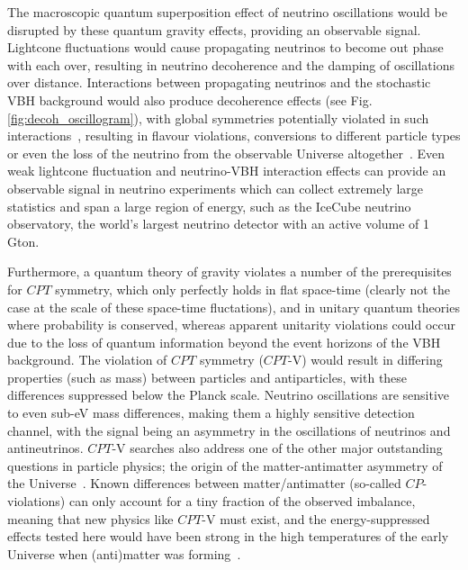 \documentclass[a4paper,11pt]{article}
\begin{document}
The macroscopic quantum superposition effect of neutrino oscillations would be disrupted by these quantum gravity effects, providing an observable signal. Lightcone fluctuations would cause propagating neutrinos to become out phase with each over, resulting in neutrino decoherence and the damping of oscillations over distance. Interactions between propagating neutrinos and the stochastic VBH background would also produce decoherence effects (see Fig. \ref{fig:decoh_oscillogram}), with global symmetries potentially violated in such interactions~\cite{Anchordoqui:2005gj, Harlow:2018jwu, PhysRevD.102.115003, Hellmann:2021jyz}, resulting in flavour violations, conversions to different particle types or even the loss of the neutrino from the observable Universe altogether~\cite{Anchordoqui:2005gj, Anchordoqui:2006xv, Witten:2017hdv}. Even weak lightcone fluctuation and neutrino-VBH interaction effects can provide an observable signal in neutrino experiments which can collect extremely large statistics and span a large region of energy, such as the IceCube neutrino observatory, the world's largest neutrino detector with an active volume of 1 Gton.

Furthermore, a quantum theory of gravity violates a number of the prerequisites for $CPT$ symmetry, which only perfectly holds in flat space-time (clearly not the case at the scale of these space-time fluctations), and in unitary quantum theories where probability is conserved, whereas apparent unitarity violations could occur due to the loss of quantum information beyond the event horizons of the VBH background. The violation of $CPT$ symmetry ($CPT$-V) would result in differing properties (such as mass) between particles and antiparticles, with these differences suppressed below the Planck scale. Neutrino oscillations are sensitive to even sub-eV mass differences, making them a highly sensitive detection channel, with the signal being an asymmetry in the oscillations of neutrinos and antineutrinos. $CPT$-V searches also address one of the other major outstanding questions in particle physics; the origin of the matter-antimatter asymmetry of the Universe~\cite{Sakharov_1991}. Known differences between matter/antimatter (so-called $CP$-violations) can only account for a tiny fraction of the observed imbalance, meaning that new physics like $CPT$-V must exist, and the energy-suppressed effects tested here would have been strong in the high temperatures of the early Universe when (anti)matter was forming~\cite{Mavromatos:2017cxr, hep-ph/9809542, Ellis:2013gca}. \\
\end{document}
